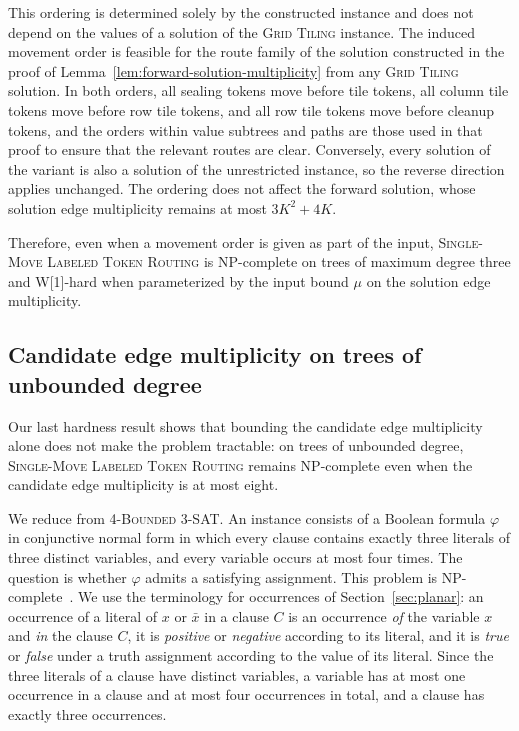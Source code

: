 \documentclass[a4paper,USenglish,thm-restate]{lipics-v2021}
\theoremstyle{problemstyle}
\begin{document}
This ordering is determined solely by the constructed instance and does not depend on the values of a solution of the \textsc{Grid Tiling} instance. The induced movement order is feasible for the route family of the solution constructed in the proof of Lemma~\ref{lem:forward-solution-multiplicity} from any \textsc{Grid Tiling} solution. In both orders, all sealing tokens move before tile tokens, all column tile tokens move before row tile tokens, and all row tile tokens move before cleanup tokens, and the orders within value subtrees and paths are those used in that proof to ensure that the relevant routes are clear. Conversely, every solution of the variant is also a solution of the unrestricted instance, so the reverse direction applies unchanged. The ordering does not affect the forward solution, whose solution edge multiplicity remains at most $3K^2+4K$.

Therefore, even when a movement order is given as part of the input, \textsc{Single-Move Labeled Token Routing} is \textsf{NP}-complete on trees of maximum degree three and \textsf{W}[1]-hard when parameterized by the input bound $\mu$ on the solution edge multiplicity.





\subsection{Candidate edge multiplicity on trees of unbounded degree}
\label{sec:cm-hardness}
Our last hardness result shows that bounding the candidate edge multiplicity
alone does not make the problem tractable: on trees of unbounded degree,
\textsc{Single-Move Labeled Token Routing} remains \textsf{NP}-complete even
when the candidate edge multiplicity is at most eight.

We reduce from \textsc{4-Bounded 3-SAT}. An instance consists of a Boolean
formula $\varphi$ in conjunctive normal form in which every clause contains
exactly three literals of three distinct variables, and every variable
occurs at most four times. The question is whether $\varphi$ admits a
satisfying assignment. This problem is
\textsf{NP}-complete~\cite{DBLP:journals/dam/Tovey84}. We use the
terminology for occurrences of Section~\ref{sec:planar}: an occurrence of a
literal of $x$ or $\bar x$ in a clause $C$ is an occurrence \emph{of} the
variable $x$ and \emph{in} the clause $C$, it is \emph{positive} or
\emph{negative} according to its literal, and it is \emph{true} or
\emph{false} under a truth assignment according to the value of its
literal. Since the three literals of a clause have distinct variables, a
variable has at most one occurrence in a clause and at most four
occurrences in total, and a clause has exactly three occurrences.
\end{document}
